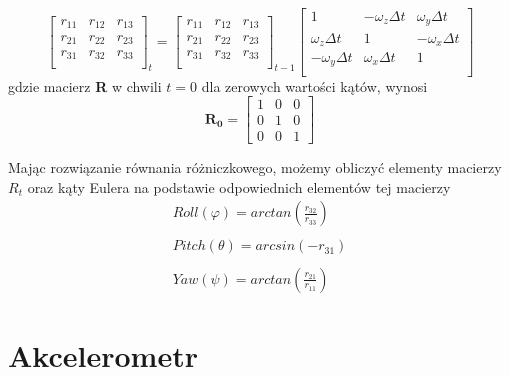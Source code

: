 $$
    \left[
    \begin{array}{ccc}
        r_{11} & r_{12} & r_{13} \\
        r_{21} & r_{22} & r_{23} \\
        r_{31} & r_{32} & r_{33} \\
    \end{array}
    \right]_t
    =
    \left[
    \begin{array}{ccc}
        r_{11} & r_{12} & r_{13} \\
        r_{21} & r_{22} & r_{23} \\
        r_{31} & r_{32} & r_{33} \\
    \end{array}
    \right]_{t-1}
    \left[
    \begin{array}{ccc}
        1 & -\omega_z\Delta t & \omega_y\Delta t \\
        \omega_z\Delta t & 1 & -\omega_x\Delta t \\
        -\omega_y\Delta t & \omega_x\Delta t & 1 \\
    \end{array}
    \right]
$$
gdzie macierz \textbf{R} w chwili $t=0$ dla zerowych wartości kątów, wynosi
$$
    \mathbf{R_{0}} =
    \left[
    \begin{array}{ccc}
        1 & 0 & 0 \\
        0 & 1 & 0 \\
        0 & 0 & 1
    \end{array}
    \right]
$$

Mając rozwiązanie równania różniczkowego, możemy obliczyć elementy macierzy $R_t$ oraz kąty Eulera na podstawie odpowiednich elementów tej macierzy
\begin{equation}
    \begin{array}{c}
        Roll(\varphi) = arctan(\frac{r_{32}}{r_{33}}) \\ \\
        Pitch(\theta) = arcsin(-r_{31}) \\ \\
        Yaw(\psi) = arctan(\frac{r_{21}}{r_{11}})
    \end{array}
\end{equation}

\clearpage
\section{Akcelerometr}

